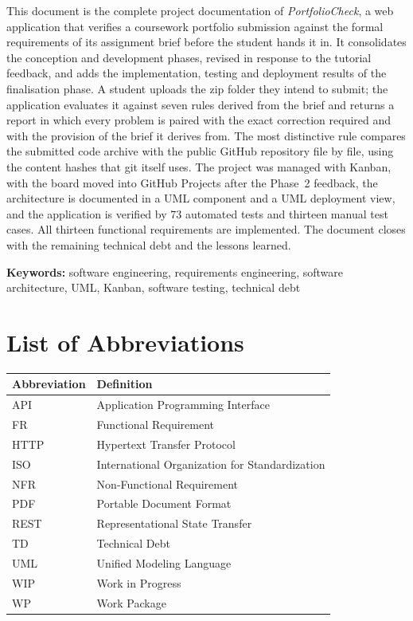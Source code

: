 \documentclass[a4paper,11pt]{article}
\begin{document}
This document is the complete project documentation of \textit{PortfolioCheck},
a web application that verifies a coursework portfolio submission against the
formal requirements of its assignment brief before the student hands it in. It
consolidates the conception and development phases, revised in response to the
tutorial feedback, and adds the implementation, testing and deployment results
of the finalisation phase. A student uploads the zip folder they intend to
submit; the application evaluates it against seven rules derived from the brief
and returns a report in which every problem is paired with the exact correction
required and with the provision of the brief it derives from. The most
distinctive rule compares the submitted code archive with the public GitHub
repository file by file, using the content hashes that git itself uses. The
project was managed with Kanban, with the board moved into GitHub Projects after
the Phase~2 feedback, the architecture is
documented in a UML component and a UML deployment view, and the application
is verified by 73 automated tests and thirteen manual test cases. All thirteen
functional requirements are implemented. The document closes with the remaining
technical debt and the lessons learned.

\textbf{Keywords:} software engineering, requirements engineering, software
architecture, UML, Kanban, software testing, technical debt

\newpage
\tableofcontents
\vspace{0.6cm}
\listoffigures
\vspace{0.3cm}
\listoftables
\newpage

\section*{List of Abbreviations}
\begin{tabularx}{\textwidth}{@{}l X@{}}
\toprule
\textbf{Abbreviation} & \textbf{Definition} \\
\midrule
API   & Application Programming Interface \\
FR    & Functional Requirement \\
HTTP  & Hypertext Transfer Protocol \\
ISO   & International Organization for Standardization \\
NFR   & Non-Functional Requirement \\
PDF   & Portable Document Format \\
REST  & Representational State Transfer \\
TD    & Technical Debt \\
UML   & Unified Modeling Language \\
WIP   & Work in Progress \\
WP    & Work Package \\
\bottomrule
\end{tabularx}
\newpage
\end{document}
